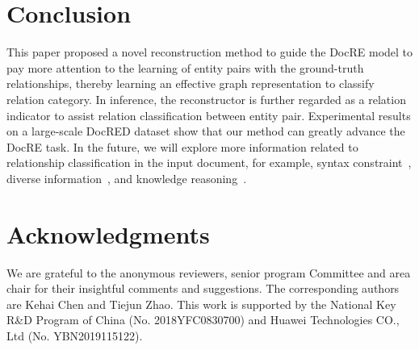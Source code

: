 \documentclass[letterpaper]{article} \usepackage{aaai21}  \usepackage{times}  \usepackage{helvet} \usepackage{courier}  \usepackage[hyphens]{url}  \usepackage{graphicx} \urlstyle{rm} \def\UrlFont{\rm}  \usepackage{natbib}  \usepackage{caption} \frenchspacing  \setlength{\pdfpagewidth}{8.5in}  \setlength{\pdfpageheight}{11in}  \usepackage{amsmath}
\begin{document}
\section{Conclusion}
This paper proposed a novel reconstruction method to guide the DocRE model to pay more attention to the learning of entity pairs with the ground-truth relationships, thereby learning an effective graph representation to classify relation category.
In inference, the reconstructor is further regarded as a relation indicator to assist relation classification between entity pair. 
Experimental results on a large-scale DocRED dataset show that our method can greatly advance the DocRE task.
In the future, we will explore more information related to relationship classification in the input document, for example, syntax constraint~\cite{AAAI1816060}, diverse information~\cite{9097389}, and knowledge reasoning~\cite{Cohen2020Scalable}.  

\section*{Acknowledgments}
We are grateful to the anonymous reviewers, senior program Committee and area chair for their insightful comments and suggestions.
The corresponding authors are Kehai Chen and Tiejun Zhao.
This work is supported by the National Key R\&D Program of China (No. 2018YFC0830700) and Huawei Technologies CO., Ltd (No. YBN2019115122).


\end{document}
